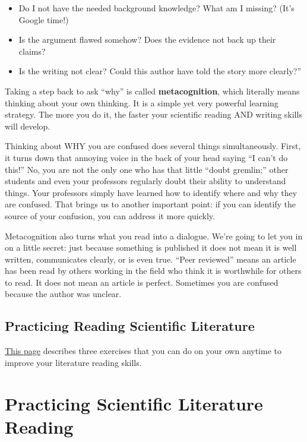 \documentclass[
]{book}
\providecommand{\tightlist}{%
  \setlength{\itemsep}{0pt}\setlength{\parskip}{0pt}}
\begin{document}
\begin{itemize}
\tightlist
\item
  Do I not have the needed background knowledge? What am I missing? (It's Google time!)
\item
  Is the argument flawed somehow? Does the evidence not back up their claims?
\item
  Is the writing not clear? Could this author have told the story more clearly?''
\end{itemize}

Taking a step back to ask ``why'' is called \textbf{metacognition}, which literally means thinking about your own thinking. It is a simple yet very powerful learning strategy. The more you do it, the faster your scientific reading AND writing skills will develop.

Thinking about WHY you are confused does several things simultaneously. First, it turns down that annoying voice in the back of your head saying ``I can't do this!'' No, you are not the only one who has that little ``doubt gremlin;'' other students and even your professors regularly doubt their ability to understand things. Your professors simply have learned how to identify where and why they are confused. That brings us to another important point: if you can identify the source of your confusion, you can address it more quickly.

Metacognition also turns what you read into a dialogue. We're going to let you in on a little secret: just because something is published it does not mean it is well written, communicates clearly, or is even true. ``Peer reviewed'' means an article has been read by others working in the field who think it is worthwhile for others to read. It does not mean an article is perfect. Sometimes you are confused because the author was unclear.

\hypertarget{practicing-reading-scientific-literature}{%
\section{Practicing Reading Scientific Literature}\label{practicing-reading-scientific-literature}}

\protect\hyperlink{readstrats125}{This page} describes three exercises that you can do on your own anytime to improve your literature reading skills.

\hypertarget{readstrats125}{%
\chapter{Practicing Scientific Literature Reading}\label{readstrats125}}
\end{document}
